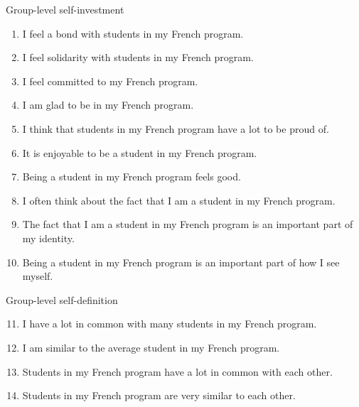 \documentclass[output=paper,colorlinks,citecolor=brown,draftmode]{langscibook}
\begin{document}
Group-level self-investment
\begin{enumerate}
\item	I feel a bond with students in my French program.

\item	I feel solidarity with students in my French program.

\item	I feel committed to my French program.

\item	I am glad to be in my French program.

\item	I think that students in my French program have a lot to be proud of.

\item	It is enjoyable to be a student in my French program.

\item	Being a student in my French program feels good.

\item	I often think about the fact that I am a student in my French program.

\item	The fact that I am a student in my French program is an important part of my identity.

\item Being a student in my French program is an important part of how I see myself.
\end{enumerate}

\medskip

\noindent Group-level self-definition

\begin{enumerate}
\setcounter{enumi}{10}
\item	I have a lot in common with many students in my French program.

\item	I am similar to the average student in my French program.

\item	Students in my French program have a lot in common with each other.

\item	Students in my French program are very similar to each other.
\end{enumerate}
\end{document}
